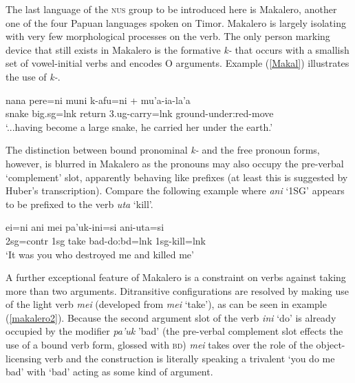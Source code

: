The last language of the \textsc{nus} group to be introduced here is Makalero, another one of the four Papuan languages spoken on Timor. Makalero is largely isolating with very few morphological processes on the verb. The only person marking device that still exists in Makalero is the formative \textit{k-} that occurs with a smallish set of vowel-initial verbs and encodes O arguments. Example (\ref{Makal}) illustrates the use of \textit{k-}.

\ea \label{Makal}
\gll nana pere=ni muni k-afu=ni + mu’a-ia-la’a \\
snake big.\acs{sg}=\acs{lnk} return \acs{3}.\acs{ug}-carry=\acs{lnk} ground-under:\acs{red}-move \\
\glft `...having become a large snake, he carried her under the earth.’ \\ 
\endgl
\xe

The distinction between bound pronominal \textit{k-} and the free pronoun forms, however, is blurred in Makalero as the pronouns may also occupy the pre-verbal `complement' slot, apparently behaving like prefixes (at least this is suggested by Huber's transcription). Compare the following example where \textit{ani} `1SG' appears to be prefixed to the verb \textit{uta} `kill'.

\ea \label{makalero2}
\gll ei=ni ani mei pa’uk-ini=si ani-uta=si \\
\acs{2}\acs{sg}=\acs{contr} \acs{1}\acs{sg} take bad-do:\acs{bd}=\acs{lnk} \acs{1}\acs{sg}-kill=\acs{lnk} \\
\glft `It was you who destroyed me and killed me’ \\ 
\endgl
\xe

A further exceptional feature of Makalero is a constraint on verbs against taking more than two arguments. Ditransitive configurations are resolved by making use of the light verb \textit{mei} (developed from \textit{mei} `take'), as can be seen in example (\ref{makalero2}). Because the second argument slot of the verb \textit{ini} `do' is already occupied by the modifier \textit{pa'uk} 'bad' (the pre-verbal complement slot effects the use of a bound verb form, glossed with \textsc{bd}) \textit{mei} takes over the role of the object-licensing verb and the construction is literally speaking a trivalent `you do me bad' with `bad' acting as some kind of argument.

